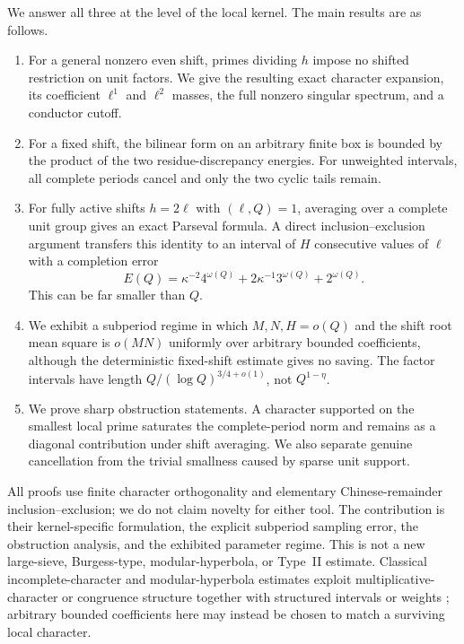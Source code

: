 \documentclass[11pt]{article}
\theoremstyle{definition}
\theoremstyle{remark}
\begin{document}
We answer all three at the level of the local kernel.  The main results are as follows.
\begin{enumerate}[label=\textbf{R\arabic*.},leftmargin=3.2em]
 \item For a general nonzero even shift, primes dividing $h$ impose no shifted restriction on unit factors.  We give the resulting exact character expansion, its coefficient $\ell^1$ and $\ell^2$ masses, the full nonzero singular spectrum, and a conductor cutoff.
 \item For a fixed shift, the bilinear form on an arbitrary finite box is bounded by the product of the two residue-discrepancy energies.  For unweighted intervals, all complete periods cancel and only the two cyclic tails remain.
 \item For fully active shifts $h=2\ell$ with $(\ell,Q)=1$, averaging over a complete unit group gives an exact Parseval formula.  A direct inclusion--exclusion argument transfers this identity to an interval of $H$ consecutive values of $\ell$ with a completion error
 \[
  E(Q)=\kappa^{-2}4^{\omega(Q)}
       +2\kappa^{-1}3^{\omega(Q)}+2^{\omega(Q)}.
 \]
 This can be far smaller than $Q$.
 \item We exhibit a subperiod regime in which $M,N,H=o(Q)$ and the shift root mean square is $o(MN)$ uniformly over arbitrary bounded coefficients, although the deterministic fixed-shift estimate gives no saving.  The factor intervals have length $Q/(\log Q)^{3/4+o(1)}$, not $Q^{1-\eta}$.
 \item We prove sharp obstruction statements.  A character supported on the smallest local prime saturates the complete-period norm and remains as a diagonal contribution under shift averaging.  We also separate genuine cancellation from the trivial smallness caused by sparse unit support.
\end{enumerate}

All proofs use finite character orthogonality and elementary Chinese-remainder inclusion--exclusion; we do not claim novelty for either tool.  The contribution is their kernel-specific formulation, the explicit subperiod sampling error, the obstruction analysis, and the exhibited parameter regime.  This is not a new large-sieve, Burgess-type, modular-hyperbola, or Type~II estimate.  Classical incomplete-character and modular-hyperbola estimates exploit multiplicative-character or congruence structure together with structured intervals or weights \citep{Bombieri1965,Burgess1962,MontgomeryVaughan2007,Shparlinski2012}; arbitrary bounded coefficients here may instead be chosen to match a surviving local character.
\end{document}
